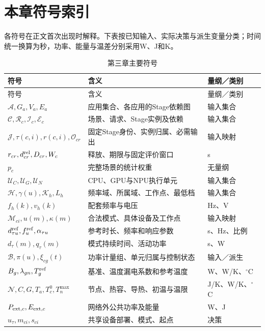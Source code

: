\clearpage
\section*{本章符号索引}

各符号在正文首次出现时解释。下表按已知输入、实际决策与派生变量分类；时间统一换算为秒，功率、能量与温差分别采用W、J和K。

\begin{longtable}{@{}p{5.3cm}p{6.0cm}>{\raggedright\arraybackslash}p{2.5cm}@{}}
\caption{第三章主要符号}\label{tab:symbols}\\
\toprule
符号 & 含义 & 量纲／类别 \\
\midrule
\endfirsthead
\toprule
符号 & 含义 & 量纲／类别 \\
\midrule
\endhead
$\mathcal A,G_a,V_a,E_a$ & 应用集合、各应用的Stage依赖图 & 输入集合 \\
$\mathcal C,\mathcal R_c,\mathcal I_c,\mathcal E_c$ & 场景、请求、Stage实例及依赖 & 输入集合 \\
$\mathcal J,\tau(c,i),r(c,i),\mathcal O_{cr}$ & 固定Stage身份、实例归属、必需输出 & 输入映射 \\
$r_{cr},d^{\rm rel}_{cr},D_{cr},W_c$ & 释放、期限与固定评价窗口 & s \\
$p_c$ & 完整场景的统计权重 & 无量纲 \\
$\mathcal U_C,\mathcal U_G,\mathcal U_N$ & CPU、GPU与NPU执行单元 & 输入集合 \\
$\mathcal H,\gamma(u),\mathcal K_h,L_h$ & 频率域、所属域、工作点、最低档 & 输入集合 \\
$f_h(k),v_h(k)$ & 配套频率与电压 & Hz、V \\
$\mathcal M_{ci},u(m),\kappa(m)$ & 合法模式、具体设备及工作点 & 输入映射 \\
$d^{\rm ref}_{\tau u},f^{\rm ref}_u,\alpha_{\tau u}$ & 参考时长、频率和响应参数 & s、Hz、比例 \\
$d_\tau(m),q_\tau(m)$ & 模式持续时间、活动功率 & s、W \\
$\mathcal B,\pi(u),\xi_{cg}(t)$ & 功率计量组、单元归属与控制状态 & 输入／派生 \\
$B_g,\lambda_{gn},T_g^{\rm ref}$ & 基准、温度漏电系数和参考温度 & W、W/K、$^\circ$C \\
$\mathcal N,C,G,T_a,T_c^0,T_n^{\max}$ & 节点、热容、导热、初温与温限 & J/K、W/K、$^\circ$C \\
$P_{{\rm ext},c},E_{{\rm ext},c}$ & 网络外公共功率及能量 & W、J \\
\midrule
$u_\tau,m_{ci},s_{ci}$ & 共享设备部署、模式、起点 & 决策 \\

\end{longtable}
